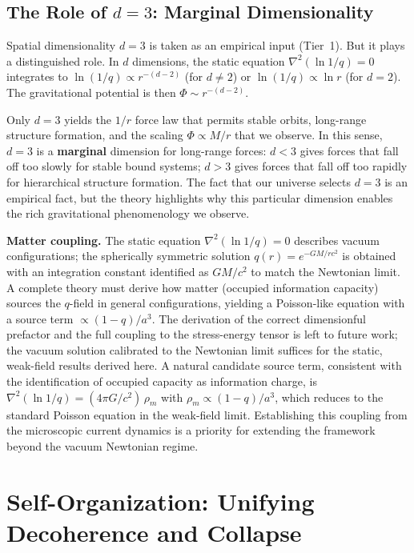 \documentclass[aps,prd,twocolumn,showpacs,superscriptaddress,preprintnumbers]{revtex4-2}
\begin{document}
\subsection{The Role of $d=3$: Marginal Dimensionality}
\label{sec:d3}

Spatial dimensionality $d=3$ is taken as an empirical input (Tier~1).
But it plays a distinguished role.
In $d$ dimensions, the static equation $\nabla^2(\ln 1/q)=0$ integrates to $\ln(1/q)\propto r^{-(d-2)}$ (for $d\neq2$) or $\ln(1/q)\propto\ln r$ (for $d=2$).
The gravitational potential is then $\Phi\sim r^{-(d-2)}$.

Only $d=3$ yields the $1/r$ force law that permits stable orbits, long-range structure formation, and the scaling $\Phi\propto M/r$ that we observe.
In this sense, $d=3$ is a \textbf{marginal} dimension for long-range forces: $d<3$ gives forces that fall off too slowly for stable bound systems; $d>3$ gives forces that fall off too rapidly for hierarchical structure formation.
The fact that our universe selects $d=3$ is an empirical fact, but the theory highlights why this particular dimension enables the rich gravitational phenomenology we observe.

\textbf{Matter coupling.}
The static equation $\nabla^2(\ln 1/q)=0$ describes vacuum configurations; the spherically symmetric solution $q(r)=e^{-GM/rc^2}$ is obtained with an integration constant identified as $GM/c^2$ to match the Newtonian limit.
A complete theory must derive how matter (occupied information capacity) sources the $q$-field in general configurations, yielding a Poisson-like equation with a source term $\propto(1-q)/a^3$.
The derivation of the correct dimensionful prefactor and the full coupling to the stress-energy tensor is left to future work; the vacuum solution calibrated to the Newtonian limit suffices for the static, weak-field results derived here.
A natural candidate source term, consistent with the identification of occupied capacity as information charge, is $\nabla^2(\ln 1/q) = (4\pi G/c^2)\,\rho_m$ with $\rho_m \propto (1-q)/a^3$, which reduces to the standard Poisson equation in the weak-field limit.
Establishing this coupling from the microscopic current dynamics is a priority for extending the framework beyond the vacuum Newtonian regime.

\section{Self-Organization: Unifying Decoherence and Collapse}
\label{sec:selforg}
\end{document}
